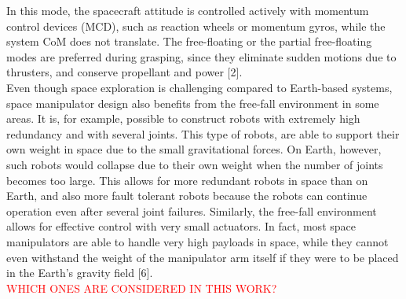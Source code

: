 \documentclass[a4paper,12pt,oneside]{report}
\begin{document}
In this mode, the spacecraft attitude is controlled actively with momentum control devices (MCD), such as reaction wheels or momentum gyros, while the system CoM does not translate. The free-floating or the partial free-floating modes are preferred during grasping, since they eliminate sudden motions due to thrusters, and conserve propellant and power [2].\\
Even though space exploration is challenging compared to Earth-based systems, space manipulator design also benefits from the free-fall environment in some areas. It is, for example, possible to construct robots with extremely high redundancy and with several joints. This type of robots, are able to support their own weight in space due to the small gravitational forces. On Earth, however, such robots would collapse due to their own weight when the number of joints becomes too large. This allows for more redundant robots in space than on Earth, and also more fault tolerant robots because the robots can continue operation even after several joint failures. Similarly, the free-fall environment allows for effective control with very small actuators. In fact, most space manipulators are able to handle very high payloads in space, while they cannot even withstand the weight of the manipulator arm itself if they were to be placed in the Earth’s gravity field [6].\\
\textcolor{red}{WHICH ONES ARE CONSIDERED IN THIS WORK?}\\
\end{document}
